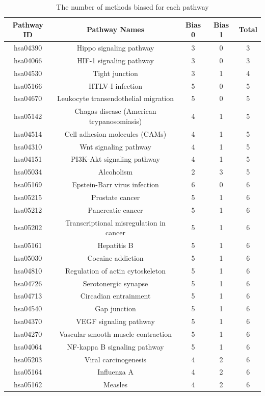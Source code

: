 \documentclass[Minh_PhD_thesis.tex]{subfiles}
\begin{document}
\clearpage
\begin{center}
\centering
\footnotesize
\begin{longtable}{@{}ccccc@{}}
\caption{The number of methods biased for each pathway\label{table:NrBiasedMethod}}\\
\hline
 \textbf{Pathway ID}& \textbf{Pathway Names} & \textbf{Bias 0} & \textbf{Bias 1} & \textbf{Total} \\
 \hline
hsa04390	&Hippo signaling pathway&	3&	0&	3\\
hsa04066	&HIF-1 signaling pathway&	3&	0&	3\\
hsa04530	&Tight junction&	3&	1&	4\\
hsa05166	&HTLV-I infection&	5&	0&	5\\
hsa04670	&Leukocyte transendothelial migration&	5&	0&	5\\
hsa05142	&Chagas disease (American trypanosomiasis)&	4&	1&	5\\
hsa04514	&Cell adhesion molecules (CAMs)&	4&	1&	5\\
hsa04310	&Wnt signaling pathway&	4&	1&	5\\
hsa04151	&PI3K-Akt signaling pathway&	4&	1&	5\\
hsa05034	&Alcoholism&	2&	3&	5\\
hsa05169	&Epstein-Barr virus infection&	6&	0&	6\\
hsa05215	&Prostate cancer&	5&	1&	6\\
hsa05212	&Pancreatic cancer&	5&	1&	6\\
hsa05202	&Transcriptional misregulation in cancer&	5&	1&	6\\
hsa05161	&Hepatitis B&	5&	1&	6\\
hsa05030	&Cocaine addiction&	5&	1&	6\\
hsa04810	&Regulation of actin cytoskeleton&	5&	1&	6\\
hsa04726	&Serotonergic synapse&	5&	1&	6\\
hsa04713	&Circadian entrainment&	5&	1&	6\\
hsa04540	&Gap junction&	5&	1&	6\\
hsa04370	&VEGF signaling pathway&	5&	1&	6\\
hsa04270	&Vascular smooth muscle contraction&	5&	1&	6\\
hsa04064	&NF-kappa B signaling pathway&	5&	1&	6\\
hsa05203	&Viral carcinogenesis&	4&	2&	6\\
hsa05164	&Influenza A&	4&	2&	6\\
hsa05162	&Measles	&4&	2&	6\\

\end{longtable}
\end{center}
\end{document}

